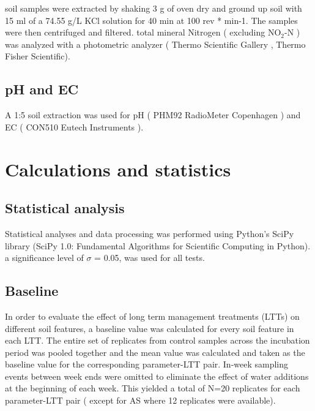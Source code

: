 \documentclass[12pt]{report}
\begin{document}
		soil samples were extracted by shaking 3 g of oven dry and ground up soil with 15 ml of a 74.55 g/L KCl solution for 40 min at 100 rev * min-1. The samples were then centrifuged and filtered. total mineral Nitrogen ( excluding NO$_2$-N ) was analyzed with a photometric analyzer ( Thermo Scientific Gallery , Thermo Fisher Scientific).
		
		\subsection{pH and EC}
		
		A 1:5 soil extraction was used for pH ( PHM92 RadioMeter Copenhagen ) and EC ( CON510 Eutech Instruments ).
		
		
		\section{Calculations and statistics}
		
		\subsection{Statistical analysis}
		
		Statistical analyses and data processing was performed using Python’s SciPy library (SciPy 1.0: Fundamental Algorithms for Scientific Computing in Python).  a significance level of $\sigma$  = 0.05, was used for all tests. \\
		
		\subsection{Baseline}
		
		In order to evaluate the effect of long term management treatments (LTTs) on different soil features, a baseline value was calculated for every soil feature in each LTT. The entire set of replicates from control samples across the incubation period was pooled together and the mean value was calculated and taken as the baseline value for the corresponding parameter-LTT pair. In-week sampling events between week ends were omitted to eliminate the effect of water additions at the beginning of each week. This yielded a total of N=20 replicates for each parameter-LTT pair ( except for AS where 12 replicates were available).
		
\end{document}

